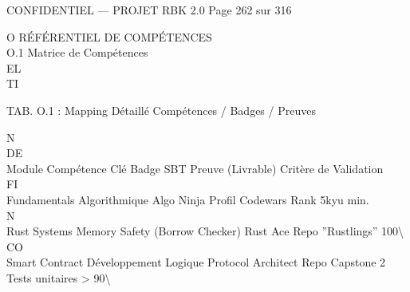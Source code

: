 \vspace{0.5em}
\vspace{0.5em}
\begin{confidential}CONFIDENTIEL — PROJET RBK 2.0                                      Page 262 sur 316\end{confidential}
O \textbar{} RÉFÉRENTIEL DE COMPÉTENCES\\
\vspace{0.5em}
\vspace{0.5em}
O.1 Matrice de Compétences\\
\vspace{0.5em}
\vspace{0.5em}
\vspace{0.5em}
\vspace{0.5em}
EL\\
TI\\
\begin{center}\begin{tabular}TAB. O.1 : Mapping Détaillé Compétences / Badges / Preuves\end{tabular}\end{center}
\vspace{0.5em}
\vspace{0.5em}
\vspace{0.5em}
\vspace{0.5em}
N\\
DE\\
Module         Compétence Clé                  Badge SBT        Preuve (Livrable)      Critère de Validation\\
\vspace{0.5em}
\vspace{0.5em}
\vspace{0.5em}
\vspace{0.5em}
FI\\
Fundamentals   Algorithmique                   Algo Ninja       Profil Codewars        Rank 5kyu min.\\
\vspace{0.5em}
\vspace{0.5em}
\vspace{0.5em}
N\\
Rust Systems   Memory Safety (Borrow Checker) Rust Ace          Repo ”Rustlings”       100\textbackslash{}%
CO\\
Smart Contract Développement Logique           Protocol Architect Repo Capstone 2      Tests unitaires \textgreater{} 90\textbackslash{}%
